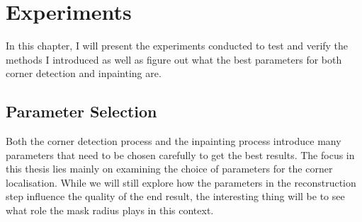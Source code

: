 \newcommand*{\addheight}[2][.5ex]{%
  \raisebox{0pt}[\dimexpr\height+(#1)\relax]{#2}%
}

\chapter{Experiments}\label{ch:Experiments} 
In this chapter, I will present the experiments conducted to test and verify the methods I
introduced as well as figure out what the best parameters for both corner detection and inpainting
are.
\section{Parameter Selection}\label{sec:ParameterSelection}
Both the corner detection process and the inpainting process introduce many parameters that need to
be chosen carefully to get the best results. The focus in this thesis lies mainly on examining the
choice of parameters for the corner localisation. While we will still explore how the parameters in
the reconstruction step influence the quality of the end result, the interesting thing will be to
see what role the mask radius plays in this context.

